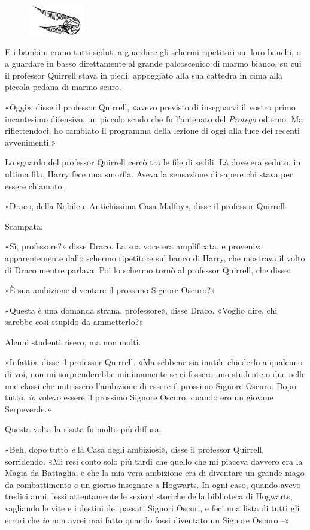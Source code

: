 \begin{figure}[h!]
        \includegraphics[scale=0.4]{boccino.png}
        \centering
\end{figure}

E i bambini erano tutti seduti a guardare gli schermi ripetitori sui loro banchi, o a guardare in basso direttamente al grande palcoscenico di marmo bianco, su cui il professor Quirrell stava in piedi, appoggiato alla sua cattedra in cima alla piccola pedana di marmo scuro.

«Oggi», disse il professor Quirrell, «avevo previsto di insegnarvi il vostro primo incantesimo difensivo, un piccolo scudo che fu l’antenato del \textit{Protego} odierno. Ma riflettendoci, ho cambiato il programma della lezione di oggi alla luce dei recenti avvenimenti.»

Lo sguardo del professor Quirrell cercò tra le file di sedili. Là dove era seduto, in ultima fila, Harry fece una smorfia. Aveva la sensazione di sapere chi stava per essere chiamato.

«Draco, della Nobile e Antichissima Casa Malfoy», disse il professor Quirrell.

Scampata.

«Sì, professore?» disse Draco. La sua voce era amplificata, e proveniva apparentemente dallo schermo ripetitore sul banco di Harry, che mostrava il volto di Draco mentre parlava. Poi lo schermo tornò al professor Quirrell, che disse:

«È sua ambizione diventare il prossimo Signore Oscuro?»

«Questa è una domanda strana, professore», disse Draco. «Voglio dire, chi sarebbe così stupido da ammetterlo?»

Alcuni studenti risero, ma non molti.

«Infatti», disse il professor Quirrell. «Ma sebbene sia inutile chiederlo a qualcuno di voi, non mi sorprenderebbe minimamente se ci fossero uno studente o due nelle mie classi che nutrissero l’ambizione di essere il prossimo Signore Oscuro. Dopo tutto, \textit{io} volevo essere il prossimo Signore Oscuro, quando ero un giovane Serpeverde.»

Questa volta la risata fu molto più diffusa.

«Beh, dopo tutto \textit{è} la Casa degli ambiziosi», disse il professor Quirrell, sorridendo. «Mi resi conto solo più tardi che quello che mi piaceva davvero era la Magia da Battaglia, e che la mia vera ambizione era di diventare un grande mago da combattimento e un giorno insegnare a Hogwarts. In ogni caso, quando avevo tredici anni, lessi attentamente le sezioni storiche della biblioteca di Hogwarts, vagliando le vite e i destini dei passati Signori Oscuri, e feci una lista di tutti gli errori che \textit{io} non avrei mai fatto quando fossi diventato un Signore Oscuro –»


